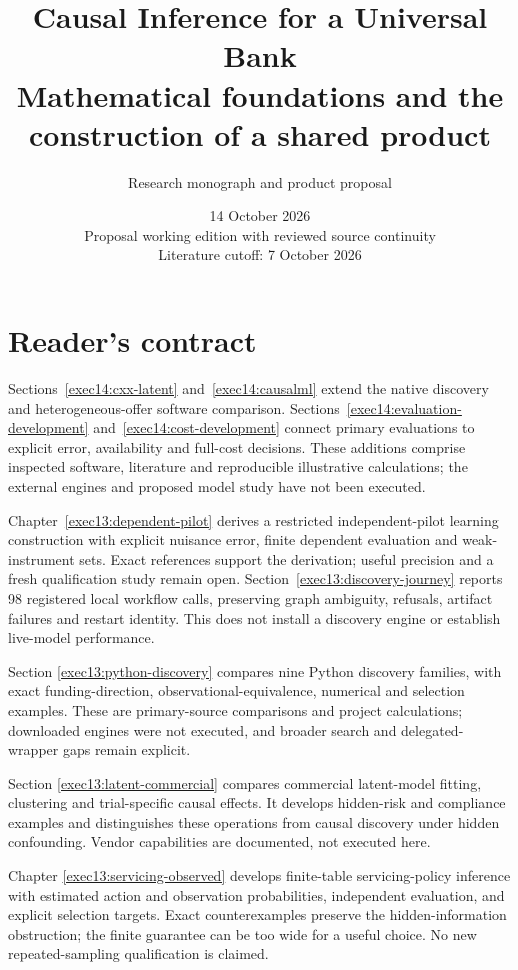 \documentclass[11pt,a4paper,openany]{book}
\title{\sffamily\bfseries\color{ink}Causal Inference for a Universal Bank\\[14pt]
\Large Mathematical foundations and the construction of a shared product}
\author{Research monograph and product proposal}
\date{14 October 2026\\Proposal working edition with reviewed source continuity\\Literature cutoff: 7 October 2026}
\begin{document}
\frontmatter
\maketitle
\chapter*{Reader's contract}

Sections~\ref{exec14:cxx-latent} and~\ref{exec14:causalml} extend the native discovery and heterogeneous-offer software comparison. Sections~\ref{exec14:evaluation-development} and~\ref{exec14:cost-development} connect primary evaluations to explicit error, availability and full-cost decisions. These additions comprise inspected software, literature and reproducible illustrative calculations; the external engines and proposed model study have not been executed.


Chapter~\ref{exec13:dependent-pilot} derives a restricted independent-pilot
learning construction with explicit nuisance error, finite dependent evaluation
and weak-instrument sets. Exact references support the derivation; useful
precision and a fresh qualification study remain open.
Section~\ref{exec13:discovery-journey} reports 98 registered local workflow
calls, preserving graph ambiguity, refusals, artifact failures and restart
identity. This does not install a discovery engine or establish live-model performance.


Section \ref{exec13:python-discovery} compares nine Python discovery families,
with exact funding-direction, observational-equivalence, numerical and selection examples.
These are primary-source comparisons and project calculations; downloaded engines
were not executed, and broader search and delegated-wrapper gaps remain explicit.


Section \ref{exec13:latent-commercial} compares commercial latent-model fitting,
clustering and trial-specific causal effects. It develops hidden-risk and
compliance examples and distinguishes these operations from causal discovery
under hidden confounding. Vendor capabilities are documented, not executed here.


Chapter \ref{exec13:servicing-observed} develops finite-table servicing-policy
inference with estimated action and observation probabilities, independent
evaluation, and explicit selection targets. Exact counterexamples preserve
the hidden-information obstruction; the finite guarantee can be too wide
for a useful choice. No new repeated-sampling qualification is claimed.
\end{document}
